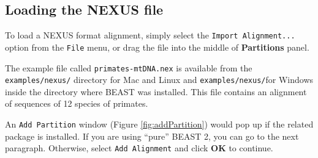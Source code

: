 \documentclass[11pt]{article}
\newcommand{\TODO}[1]{}
\theoremstyle{plain}%
\theoremstyle{definition}
\theoremstyle{remark}
\begin{document}
\subsection{Loading the NEXUS file }

To load a NEXUS format alignment, simply select the \texttt{Import Alignment...} option from the \texttt{File} menu, or drag the file into the middle of {\bf Partitions} panel. 

The example file called \texttt{primates-mtDNA.nex} is available from the {\tt examples/nexus/} directory for Mac and Linux and  {\tt examples/nexus/}for Windows inside the directory where BEAST was installed.
This file contains an alignment of sequences of 12 species of primates. 

%
%
%

%
%

An \texttt{Add Partition} window (Figure \ref{fig:addPartition}) would pop up if the related package is installed. If you are using ``pure'' BEAST 2, you can go to the next paragraph.    
Otherwise, select \texttt{Add Alignment} and click \textbf{OK} to continue.
\end{document}
